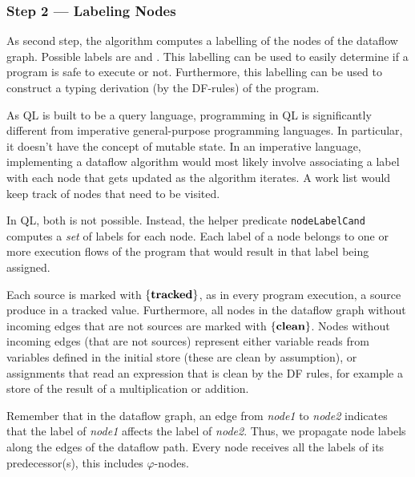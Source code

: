 \subsubsection*{Step 2 --- Labeling Nodes}
\newcommand{\coloredset}[1]{{\color{red}$\{#1\}$}}
\newcommand{\setclean}{\coloredset{\labclean}}
\newcommand{\settracked}{\coloredset{\labtracked}}
\newcommand{\setboth}{\coloredset{\labclean, \labtracked}}
\newcommand{\clclean}{:\ {\color{red}$\lclean$}}
\newcommand{\cltracked}{:\ {\color{red}$\ltracked$}}
\newcommand{\clunknown}{:\ {\color{red}$\lunknown$}}

As second step, the algorithm computes a labelling of the nodes of the dataflow graph.
Possible labels are \labclean{} and \labtracked{}.
This labelling can be used to easily determine if a program is safe to execute or not.
Furthermore, this labelling can be used to construct a typing derivation (by the DF-rules)
of the program.

As QL is built to be a query language, programming in QL is significantly different
from imperative general-purpose programming languages.
In particular, it doesn't have the concept of mutable state.
In an imperative language, implementing a dataflow algorithm would most
likely involve associating a label with each node that gets updated as the 
algorithm iterates.
A work list would keep track of nodes that need to be visited.

In QL, both is not possible.
Instead, the helper predicate \texttt{nodeLabelCand} computes a \emph{set} of
labels for each node.
Each label of a node belongs to one or more execution flows of the program 
that would result in that label being assigned.

Each source is marked with $\{\textbf{tracked}\}$, as in every program execution,
a source produce in a tracked value.
Furthermore, all nodes in the dataflow graph without
incoming edges that are not sources are marked with $\{\textbf{clean}\}$.
Nodes without incoming edges (that are not sources) represent either variable reads 
from variables defined in the initial store (these are clean by assumption), or 
assignments that read an expression that is clean by the DF rules, for example
a store of the result of a multiplication or addition.

Remember that in the dataflow graph, an edge from \textit{node1} to \textit{node2}
indicates that the label of \textit{node1} affects the label of \textit{node2}.
Thus, we propagate node labels along the edges of the dataflow path.
Every node receives all the labels of its predecessor(s), this includes
$\varphi$-nodes.

